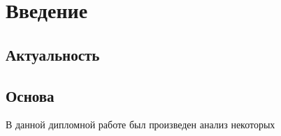 \section{Введение}
\subsection{Актуальность}
\subsection{Основа}
В данной дипломной работе был произведен анализ некоторых
